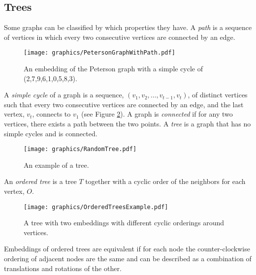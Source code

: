 \subsection{Trees}
Some graphs can be classified by which properties they have.
A \textit{path} is a sequence of vertices in which every two consecutive vertices are connected by an edge.   
\begin{figure}[!htbp]
\begin{center}
\texttt{[image: graphics/PetersonGraphWithPath.pdf]}
\caption{An embedding of the Peterson graph with a simple cycle of 
(2,7,9,6,1,0,5,8,3).}\label{fig:ch1-graph-2}
\end{center}
\end{figure}

A \textit{simple cycle} of a graph is a sequence, $(v_1, v_2, \dots, v_{t-1},v_t)$, of distinct vertices such that every two consecutive vertices are connected by an edge,  and the last vertex, $v_t$, connects to $v_1$ (see Figure \ref{fig:ch1-graph-2}).  
A graph is \textit{connected} if for any two vertices, there exists a path between the two points.
A \textit{tree} is a graph that has no simple cycles and is connected.
\newpage
\begin{figure}[!hbpt]
\begin{center}
\texttt{[image: graphics/RandomTree.pdf]}
\caption{An example of a tree.}\label{fig:ch1-graph-2}
\end{center}
\end{figure}


An \textit{ordered tree} is a tree $T$ together with a cyclic order of the neighbors for each vertex, $O$.
\begin{figure}[!hbpt]
\begin{center}
    \texttt{[image: graphics/OrderedTreesExample.pdf]}
    \caption{A tree with two embeddings with different cyclic orderings around 
vertices.}\label{fig:ch1-graph-6}
\end{center}
\end{figure}

Embeddings of ordered trees are equivalent if for each node the counter-clockwise ordering of 
adjacent nodes are the same and can be described as a combination of translations and rotations of the other.



